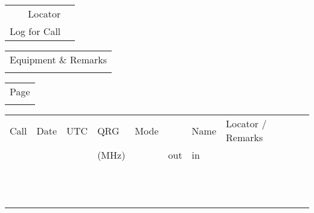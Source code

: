 \documentclass[10pt,a5paper,oneside,landscape]{article}
\begin{document}
\selectfont 

\begin{minipage}[b]{0.25\linewidth}\centering
	\begin{tabular}{rl}
  		Locator& \underline{\hspace{2.5cm}}\\ [2ex]
  		Log for Call& \underline{\hspace{2.5cm}}\\ [2ex]
	\end{tabular}
\end{minipage}
\begin{minipage}[b]{0.6\linewidth}
	\begin{tabular}{l}
  		Equipment \& Remarks\\ [2ex]
  		\underline{\hspace{11.65cm}}\\ [2ex]
	\end{tabular}
\end{minipage}
\begin{minipage}[b]{0.1\linewidth}
	\begin{tabular}{r}
		Page \\ [2ex]
  		\underline{\hspace{1.5cm}}\\ [2ex]
	\end{tabular}	
\end{minipage}

\begin{tabular}{
	| >{\centering\arraybackslash}m{2.5cm} %
	| >{\centering\arraybackslash}m{1.5cm}  %
	| >{\centering\arraybackslash}m{1.5cm}  %
	| >{\centering\arraybackslash}m{1cm}  %
	| >{\centering\arraybackslash}m{.75cm}  %
	| >{\centering\arraybackslash}m{.75cm}  %
	| >{\centering\arraybackslash}m{.75cm}  %
	| >{\centering\arraybackslash}m{1.5cm} %
	| >{\centering\arraybackslash}m{4.75cm} %
	|}
	\hline
	Call &
	Date &
	UTC &
	QRG &
	Mode &
	\multicolumn{2}{|c|}{Rapport} &
	Name &
	Locator / Remarks\\ [1ex]
	 
	&  &  & (MHz) & & out & in & & \\ [1ex]
	\hline
	&  & & &  &  & & & \\ [2ex]
	\hline
	&  & & &  &  & & & \\ [2ex]
	\hline
	&  & & &  &  & & & \\ [2ex]
	\hline
	&  & & &  &  & & & \\ [2ex]
	\hline
	&  & & &  &  & & & \\ [2ex]
	\hline
	&  & & &  &  & & & \\ [2ex]
	\hline
	&  & & &  &  & & & \\ [2ex]
	\hline
	&  & & &  &  & & & \\ [2ex]
	\hline
	&  & & &  &  & & & \\ [2ex]
	\hline
	&  & & &  &  & & & \\ [2ex]
	\hline
	&  & & &  &  & & & \\ [2ex]
	\hline
	&  & & &  &  & & & \\ [2ex]
	\hline
\end{tabular}
\pagebreak
\end{document}
